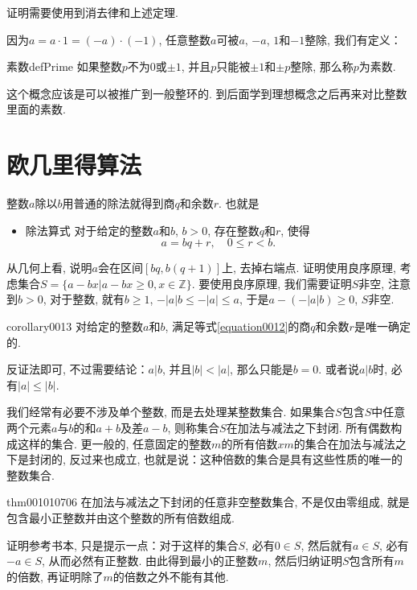 证明需要使用到消去律和上述定理. 

因为$a=a \cdot 1 = (-a) \cdot (-1)$, 任意整数$a$可被$a$, $-a$, $1$和$-1$整除, 我们有定义：
\begin{definition}{素数}{defPrime}
如果整数$p$不为0或$\pm{}1$, 并且$p$只能被$\pm{}1$和$\pm{}p$整除, 那么称$p$为素数. 
\end{definition}
这个概念应该是可以被推广到一般整环的. 到后面学到理想概念之后再来对比整数里面的素数. 

\section{欧几里得算法}\label{section0010107}
整数$a$除以$b$用普通的除法就得到商$q$和余数$r$. 也就是
\begin{itemize}
\item \textcolor{main}{除法算式} 对于给定的整数$a$和$b$, $b>0$, 存在整数$q$和$r$, 使得
\begin{equation}\label{equation0012}
a = bq + r, \quad 0 \le r < b.
\end{equation}
\end{itemize}

从几何上看, 说明$a$会在区间$[bq, b(q+1)]$上, 去掉右端点. 证明使用良序原理, 考虑集合$S = \{a-bx|a-bx \ge 0, x \in \mathbb{Z}\}$. 要使用良序原理, 我们需要证明$S$非空, 注意到$b>0$, 对于整数, 就有$b \ge 1$, $-|a|b \le -|a| \le a$, 于是$a - (-|a|b) \ge 0$, $S$非空. 

\begin{corollary}{}{corollary0013}
对给定的整数$a$和$b$, 满足等式\ref{equation0012}的商$q$和余数$r$是唯一确定的. 
\end{corollary}

反证法即可, 不过需要结论：$a|b$, 并且$|b| < |a|$, 那么只能是$b = 0$. 或者说$a|b$时, 必有$|a| \le |b|$. 

我们经常有必要不涉及单个整数, 而是去处理某整数集合. 如果集合$S$包含$S$中任意两个元素$a$与$b$的和$a+b$及差$a-b$, 则称集合$S$在加法与减法之下封闭. 所有偶数构成这样的集合. 更一般的, 任意固定的整数$m$的所有倍数$xm$的集合在加法与减法之下是封闭的, 反过来也成立, 也就是说：这种倍数的集合是具有这些性质的唯一的整数集合. 
\begin{theorem}{}{thm001010706}
在加法与减法之下封闭的任意非空整数集合, 不是仅由零组成, 就是包含最小正整数并由这个整数的所有倍数组成. 
\end{theorem}

证明参考书本, 只是提示一点：对于这样的集合$S$, 必有$0 \in S$, 然后就有$a \in S$, 必有$-a \in S$, 从而必然有正整数. 由此得到最小的正整数$m$, 然后归纳证明$S$包含所有$m$的倍数, 再证明除了$m$的倍数之外不能有其他. 

